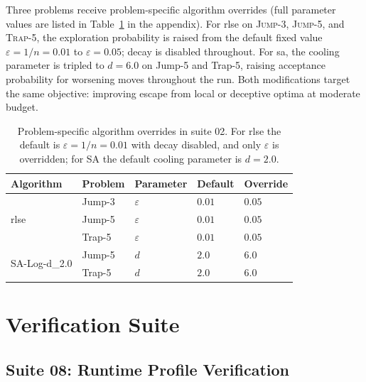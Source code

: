 Three problems receive problem-specific algorithm overrides (full parameter
  values are listed in Table~\ref{tab:suite02-overrides} in the
appendix).
For \acrshort{rlse} on \textsc{Jump-3}, \textsc{Jump-5}, and
\textsc{Trap-5}, the exploration probability is raised from the
default fixed value $\varepsilon=1/n=0.01$ to $\varepsilon=0.05$;
decay is disabled throughout.
For \acrshort{sa}, the cooling
parameter is tripled to $d=6.0$ on Jump-5 and Trap-5, raising acceptance
probability for worsening moves throughout the run. Both modifications target
the same objective: improving escape from local or deceptive optima at moderate
budget.

\begin{table}[H]
  \centering
  \small
  \begin{tabular}{@{}lllll@{}}
    \toprule
    \textbf{Algorithm} & \textbf{Problem} & \textbf{Parameter} &
    \textbf{Default} & \textbf{Override} \\
    \midrule
    \multirow{3}{*}{\acrshort{rlse}}
    & Jump-3  & $\varepsilon$ & $0.01$ & $0.05$ \\
    & Jump-5  & $\varepsilon$ & $0.01$ & $0.05$ \\
    & Trap-5  & $\varepsilon$ & $0.01$ & $0.05$ \\
    \midrule
    \multirow{2}{*}{SA-Log-d\_2.0}
    & Jump-5  & $d$ & $2.0$ & $6.0$ \\
    & Trap-5  & $d$ & $2.0$ & $6.0$ \\
    \bottomrule
  \end{tabular}
  \caption[Suite 02 algorithm overrides]{Problem-specific algorithm
    overrides in suite 02. For
    \acrshort{rlse} the default is $\varepsilon=1/n=0.01$
    with decay disabled, and only $\varepsilon$ is overridden; for SA the
  default cooling parameter is $d=2.0$.}
  \label{tab:suite02-overrides}
\end{table}

\section{Verification Suite}

\subsection{Suite 08: Runtime Profile Verification}

